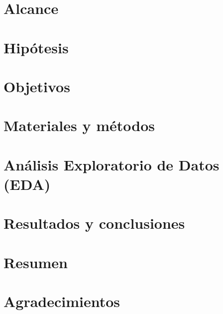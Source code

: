 \documentclass[english, a4paper, 12pt, twoside]{article}
\numberwithin{equation}{section} %
\begin{document}
\section{Alcance}
    
\clearpage

\section{Hipótesis}
    
\clearpage

\section{Objetivos}
    
\clearpage

\section{Materiales y métodos}
    
\clearpage

\section{Análisis Exploratorio de Datos (EDA)}
    
\clearpage

\section{Resultados y conclusiones}
    
\clearpage

\section{Resumen}
    
\clearpage

%    

\section{Agradecimientos}
    
\clearpage

\newpage
\renewcommand\refname{Bibliografía} %
{ %
}
\clearpage
\end{document}
